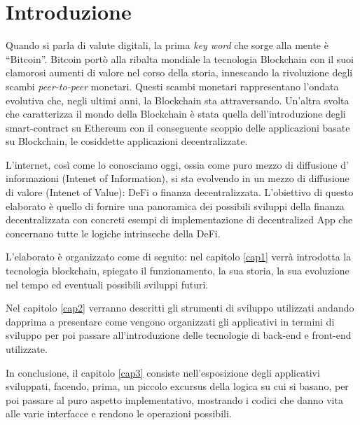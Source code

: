 
\chapter*{Introduzione}
Quando si parla di valute digitali, la prima \textit{key word} che sorge alla mente è “Bitcoin”.
Bitcoin portò alla ribalta mondiale la tecnologia Blockchain con il suoi clamorosi aumenti di valore nel corso della storia, innescando la rivoluzione degli scambi \textit{peer-to-peer} monetari.
Questi scambi monetari rappresentano l'ondata evolutiva che, negli ultimi anni, la Blockchain sta attraversando.
Un'altra svolta che caratterizza il mondo della Blockchain è stata quella dell'introduzione degli smart-contract su Ethereum con il conseguente scoppio delle applicazioni basate su Blockchain, le cosiddette applicazioni decentralizzate. 

L'internet, così come lo conosciamo oggi, ossia come puro mezzo di diffusione d' informazioni (Intenet of Information), si sta evolvendo in un mezzo di diffusione di valore (Intenet of Value): DeFi o finanza decentralizzata. L'obiettivo di questo elaborato è quello di fornire una panoramica dei possibili sviluppi della finanza decentralizzata con concreti esempi di implementazione di decentralized App che concernano tutte le logiche intrinseche della DeFi. 

L'elaborato è organizzato come di seguito:  nel capitolo \ref{cap1} verrà introdotta la tecnologia blockchain, spiegato il funzionamento, la sua storia, la sua evoluzione nel tempo ed eventuali possibili sviluppi futuri. 

Nel capitolo \ref{cap2} verranno descritti gli strumenti di sviluppo utilizzati andando dapprima a presentare come vengono organizzati gli applicativi in termini di sviluppo per poi passare all'introduzione delle tecnologie di back-end e front-end utilizzate.

In conclusione, il capitolo \ref{cap3} consiste nell'esposizione degli applicativi sviluppati, facendo, prima, un piccolo excursus della logica su cui si basano, per poi passare al puro aspetto implementativo, mostrando i codici che danno vita alle varie interfacce e rendono le operazioni possibili.